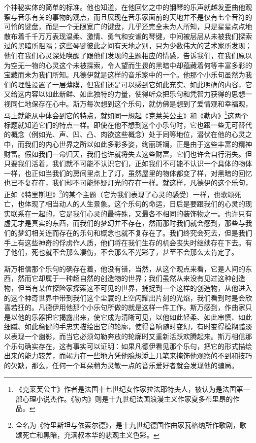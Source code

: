 个神秘实体的简单的标准。他也知道，在他回忆之中的钢琴的乐声就越发歪曲他观察与音乐有关的事物的观点，而且展现在音乐家面前的天地并不是仅有七个音符的可怜的键盘，而是一个无限宽广的键盘，几乎还完全未为人所知，只是星星点点地散布着千千万万表现温柔、激情、勇气和安谧的琴键，中间被层层从未被我们探索过的黑暗所阻隔；这些琴键彼此之间有天地之别，只为少数伟大的艺术家所发现；他们在我们心灵深处唤醒了跟他们发现的主题相应的情感，告诉我们，在我们原以为空无一物的心灵这个未被探索，令人望而生畏的黑暗中却蕴藏着何等丰富多彩的宝藏而未为我们所知。凡德伊就是这样的音乐家中的一个。他那个小乐句虽然为我们的理性设置了一层薄膜，但我们还是可以感到它如此充实、如此明确的内容，它又给这内容以如此新鲜、如此独特的力量，使得听众把乐句和凭智力获得的思想一视同仁地保存在心中。斯万每次想到这个乐句，就仿佛是想到了爱情观和幸福观，马上就能从中体会到它的特点，就如同一想起《克莱芙公主》和《勒内》\footnote{《克莱芙公主》作者是法国十七世纪女作家拉法耶特夫人，被认为是法国第一部心理小说杰作。《勒内》则是十九世纪法国浪漫主义作家夏多布里昂的作品。}这两个标题就知道它们的特点一样。即使在他不想到这个小乐句时，它也跟一些无可替代的概念（例如光、声、凹、凸、肉欲这些概念）处于同等地位，潜伏在他的心灵之中，而我们的内心世界之所以如此多彩多姿，绚丽斑斓，正是由于这些丰富的精神财富。假如我们一命归天，我们也许就将失去这些财富，它们也许会自行消失。但只要我们活着，我们就不可能不认识它们，正如我们不可能不认识一个具体的物体一样，也正如当我们的房间里点上了灯，虽然屋里的物体都变了样，对黑暗的回忆也已不复存在，我们却不可能怀疑灯光的存在一样。就这样，凡德伊的这个乐句，正如《特里斯坦》\footnote{全名为《特里斯坦与依索尔德》，是十九世纪德国作曲家瓦格纳所作歌剧，歌颂死亡和黑暗，充满叔本华的悲观主义色彩。}的某个主题（它为我们表现了心灵的感受）一样，也歌颂死亡，也体现了相当动人的人生景象。这个乐句的命运，日后是要跟我们的心灵的现实联系在一起的，它是我们心灵的最特殊，又最各不相同的装饰物之一。也许只有虚无才是真实的东西，而我们的梦幻并不存在，然而那时我们就会感到，那些与我们的梦幻相关连而存在的乐句和概念也就不复存在了。我们终究会死去，但是我们手上有这些神奇的俘虏作人质，他们将在我们生存的机会丧失时继续存在下去。有了他们，死也就不会那么凄伤，不会那么不光彩了，甚至不会那么太肯定了。
\par 斯万相信那个乐句的确存在着，他没有错，当然，从这个观点来看，它是人间的东西，然而它却属于一种超自然的创造物的世界；我们虽然从来没有见过这种创造物，但当有某位探险家探索这不可见的世界，捕捉到一个这样的创造物，从他进入的这个神奇世界中带到我们这个尘寰的上空闪耀出片刻的光焰，我们看到时是会欣喜若狂的。凡德伊用他那个小乐句所做的就是这样一件工作。斯万感到，作曲家只是以他的乐器把它揭露出来，使它成为清晰可见，以他如此轻柔、如此审慎、如此细腻、如此稳健的手忠实描绘出它的轮廓，使得音响随时变幻，有时变得模糊黯淡以表现一个幽影，而当它必须勾勒奔放的轮廓时又重新活跃欢腾起来。斯万相信那个乐句确实存在，这有事实可以证明：如果凡德伊看见那个乐句，把它的形式描绘出来的能力较差，而竭力在一些地方凭他臆想添上几笔来掩饰他观察的不到和技巧的欠缺，那么，任何一个耳朵稍为灵敏一点的音乐爱好者就会发现他的骗局。
